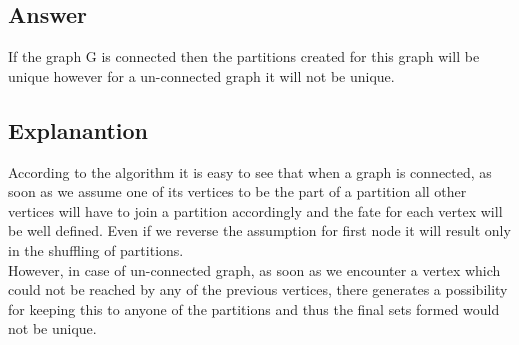 \documentclass[20pt]{article}
\begin{document}
\subsection{Answer}
If the graph G is connected then the partitions created for this graph will be unique however for a un-connected graph it will not be unique.
\subsection{Explanantion}
According to the algorithm it is easy to see that when a graph is connected, as soon as we assume one of its vertices to be the part of a partition all other vertices will have to join a partition accordingly and the fate for each vertex will be well defined. Even if we reverse the assumption for first node it will result only in the shuffling of partitions. \\
However, in case of un-connected graph, as soon as we encounter a vertex which could not be reached by any of the previous vertices, there generates a possibility for keeping this to anyone of the partitions and thus the final sets formed would not be unique.
\end{document}
